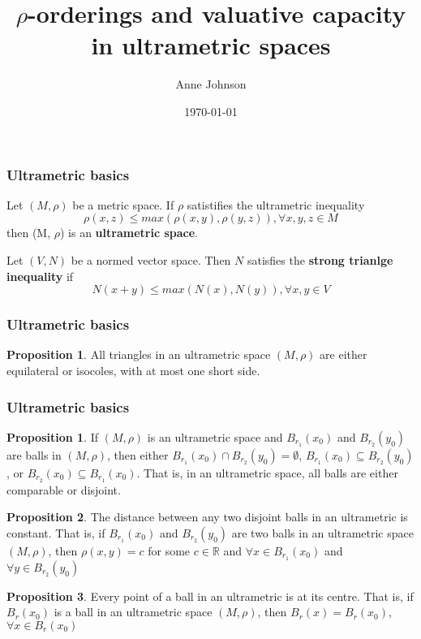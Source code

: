 \documentclass{beamer}
\title{$\rho$-orderings and valuative capacity in ultrametric spaces}
\author{Anne Johnson}
\date{\today}
\theoremstyle{definition}
\newtheorem{proposition}{Proposition}
\newtheorem*{proposition*}{Proposition}
\begin{document}
\maketitle
\begin{frame}
\frametitle{Ultrametric basics}
\begin{definition}
	 Let $(M, \rho)$ be a metric space. If $\rho$ satistifies the ultrametric inequality
	\[\rho(x,z) \leq max{(\rho(x,y), \rho(y,z))}, \forall x,y,z \in M\] 
	then (M, $\rho$) is an \textbf{ultrametric space}.
\end{definition}
\begin{definition}
	 Let $(V, N)$ be a normed vector space. Then $N$ satisfies the \textbf{strong trianlge inequality} if
	\[N(x + y) \leq max(N(x), N(y)), \forall x,y \in V \]
\end{definition}
\end{frame}

\begin{frame}
\frametitle{Ultrametric basics}
\begin{proposition}
	\cite{ar} All triangles in an ultrametric space $(M,\rho)$ are either equilateral or isocoles, with at most one short side. 
\end{proposition}
\end{frame}

\begin{frame}
\frametitle{Ultrametric basics}
\begin{proposition*}
\cite{ar} If $(M, \rho)$ is an ultrametric space and $B_{r_1}(x_0)$ and $B_{r_2}(y_0)$ are balls in $(M, \rho)$, then either $B_{r_1}(x_0) \cap B_{r_2}(y_0) = \emptyset$, $B_{r_1}(x_0) \subseteq B_{r_2}(y_0)$, or $B_{r_2}(x_0) \subseteq B_{r_1}(x_0)$. That is, in an ultrametric space, all balls are either comparable or disjoint.
\end{proposition*}
\begin{proposition*}
\cite{ar} The distance between any two disjoint balls in an ultrametric is constant. That is, if $B_{r_1}(x_0)$ and $B_{r_2}(y_0)$ are two balls in an ultrametric space $(M,\rho)$, then $\rho(x,y)=c$ for some $c \in \mathbb{R}$ and $\forall x \in B_{r_1}(x_0)$ and $\forall y \in B_{r_2}(y_0)$
\end{proposition*}
\begin{proposition*}
\cite{ar} Every point of a ball in an ultrametric is at its centre. That is, if $B_r(x_0)$ is a ball in an ultrametric space $(M,\rho)$, then $B_r(x)=B_r(x_0)$,  $\forall x \in B_r(x_0)$
\end{proposition*}
\end{frame}
\end{document}
